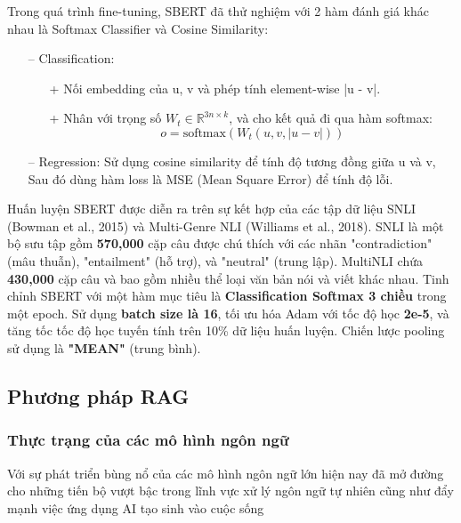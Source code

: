 \documentclass[a4paper, 12pt, openany]{book}
\begin{document}
Trong quá trình fine-tuning, SBERT đã thử nghiệm với 2 hàm đánh giá khác nhau là Softmax Classifier và Cosine Similarity:

\begin{itemize}
    \item[--] Classification: \begin{itemize}
            \item[+] Nối embedding của u, v và phép tính element-wise |u - v|.
            \item[+] Nhân với trọng số  \(W_t \in \mathbb{R}^{3n \times k}\), và cho kết quả đi qua hàm softmax:
                \begin{equation}
                    o = \text{softmax}(W_t(u, v, |u - v|))
                \end{equation}
        \end{itemize}
    \item[--] Regression: Sử dụng cosine similarity để tính độ tương đồng giữa u và v, Sau đó dùng hàm loss là MSE (Mean Square Error) để tính độ lỗi.
\end{itemize}

Huấn luyện SBERT được diễn ra trên sự kết hợp của các tập dữ liệu SNLI \cite{snli:emnlp2015} (Bowman et al., 2015) và Multi-Genre NLI \cite{N18-1101} (Williams et al., 2018).
SNLI là một bộ sưu tập gồm \textbf{570,000} cặp câu được chú thích với các nhãn "contradiction" (mâu thuẫn), "entailment" (hỗ trợ), và "neutral" (trung lập).
MultiNLI chứa \textbf{430,000} cặp câu và bao gồm nhiều thể loại văn bản nói và viết khác nhau. Tinh chỉnh SBERT với một hàm mục tiêu là \textbf{Classification Softmax 3 chiều} trong một epoch. Sử dụng \textbf{batch size là 16}, tối ưu hóa Adam với tốc độ học \textbf{2e-5},
và tăng tốc tốc độ học tuyến tính trên 10\% dữ liệu huấn luyện. Chiến lược pooling sử dụng là \textbf{"MEAN"} (trung bình).


\subsection{Phương pháp RAG}
\subsubsection{Thực trạng của các mô hình ngôn ngữ}
Với sự phát triển bùng nổ của các mô hình ngôn ngữ lớn hiện nay đã mở đường cho những tiến bộ vượt bậc trong lĩnh vực xử lý ngôn ngữ tự nhiên cũng như đẩy mạnh việc ứng dụng AI tạo sinh vào cuộc sống
\end{document}
